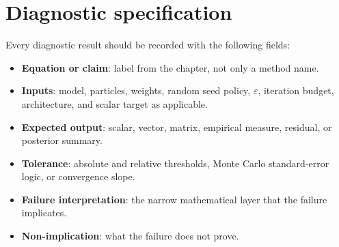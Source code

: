 \section{Diagnostic specification}
\label{sec:bf-dpf-debug-diagnostic-spec}

Every diagnostic result should be recorded with the following fields:
\begin{itemize}
  \item \textbf{Equation or claim}: label from the chapter, not only a method
    name.
  \item \textbf{Inputs}: model, particles, weights, random seed policy,
    $\varepsilon$, iteration budget, architecture, and scalar target as
    applicable.
  \item \textbf{Expected output}: scalar, vector, matrix, empirical measure,
    residual, or posterior summary.
  \item \textbf{Tolerance}: absolute and relative thresholds, Monte Carlo
    standard-error logic, or convergence slope.
  \item \textbf{Failure interpretation}: the narrow mathematical layer that the
    failure implicates.
  \item \textbf{Non-implication}: what the failure does not prove.
\end{itemize}

